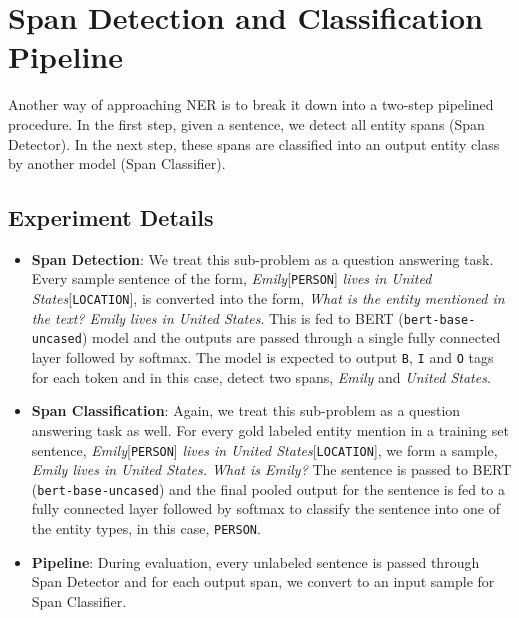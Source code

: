 \section{Span Detection and Classification Pipeline}
\label{sec:span_pipeline}
Another way of approaching NER is to break it down into a two-step pipelined procedure. In the first step, given a sentence, we detect all entity spans (Span Detector). In the next step, these spans are classified into an output entity class by another model (Span Classifier).

\subsection{Experiment Details}

\begin{itemize}
    \item \textbf{Span Detection}: We treat this sub-problem as a question answering task. Every sample sentence of the form, \textit{Emily}[\texttt{PERSON}] \textit{lives in United States}[\texttt{LOCATION}], is converted into the form, \textit{What is the entity mentioned in the text? Emily lives in United States}. This is fed to BERT (\texttt{bert-base-uncased}) model and the outputs are passed through a single fully connected layer followed by softmax. The model is expected to output \texttt{B}, \texttt{I} and \texttt{O} tags for each token and in this case, detect two spans, \textit{Emily} and \textit{United States}. 
    
    \item \textbf{Span Classification}: Again, we treat this sub-problem as a question answering task as well. For every gold labeled entity mention in a training set sentence, \textit{Emily}[\texttt{PERSON}] \textit{lives in United States}[\texttt{LOCATION}], we form a sample, \textit{Emily lives in United States. What is Emily?} The sentence is passed to BERT (\texttt{bert-base-uncased}) and the final pooled output for the sentence is fed to a fully connected layer followed by softmax to classify the sentence into one of the entity types, in this case, \texttt{PERSON}.
    
    \item \textbf{Pipeline}: During evaluation, every unlabeled sentence is passed through Span Detector and for each output span, we convert to an input sample for Span Classifier.
\end{itemize}

